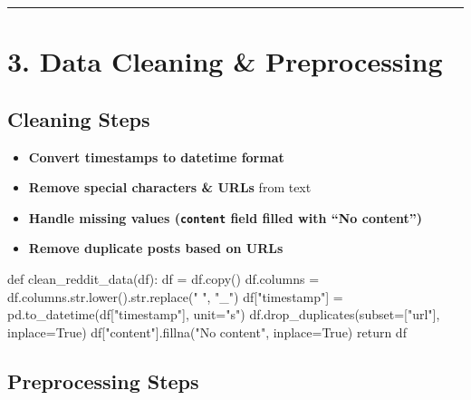 \documentclass[
  letterpaper,
  DIV=11,
  numbers=noendperiod]{scrartcl}
\newenvironment{Shaded}{\begin{snugshade}}{\end{snugshade}}
\newcommand{\BuiltInTok}[1]{\textcolor[rgb]{0.00,0.23,0.31}{#1}}
\newcommand{\ControlFlowTok}[1]{\textcolor[rgb]{0.00,0.23,0.31}{#1}}
\newcommand{\KeywordTok}[1]{\textcolor[rgb]{0.00,0.23,0.31}{#1}}
\newcommand{\NormalTok}[1]{\textcolor[rgb]{0.00,0.23,0.31}{#1}}
\newcommand{\OperatorTok}[1]{\textcolor[rgb]{0.37,0.37,0.37}{#1}}
\newcommand{\StringTok}[1]{\textcolor[rgb]{0.13,0.47,0.30}{#1}}
\newcommand{\VariableTok}[1]{\textcolor[rgb]{0.07,0.07,0.07}{#1}}
\providecommand{\tightlist}{%
  \setlength{\itemsep}{0pt}\setlength{\parskip}{0pt}}\usepackage{longtable,booktabs,array}
\begin{document}
\begin{center}\rule{0.5\linewidth}{0.5pt}\end{center}

\section{\texorpdfstring{\textbf{3. Data Cleaning \&
Preprocessing}}{3. Data Cleaning \& Preprocessing}}\label{data-cleaning-preprocessing}

\subsection{\texorpdfstring{\textbf{Cleaning
Steps}}{Cleaning Steps}}\label{cleaning-steps}

\begin{itemize}
\tightlist
\item
  \textbf{Convert timestamps to datetime format}
\item
  \textbf{Remove special characters \& URLs} from text
\item
  \textbf{Handle missing values (\texttt{content} field filled with ``No
  content'')}
\item
  \textbf{Remove duplicate posts based on URLs}
\end{itemize}

\begin{Shaded}
\begin{Highlighting}[]
\KeywordTok{def}\NormalTok{ clean\_reddit\_data(df):}
\NormalTok{    df }\OperatorTok{=}\NormalTok{ df.copy()}
\NormalTok{    df.columns }\OperatorTok{=}\NormalTok{ df.columns.}\BuiltInTok{str}\NormalTok{.lower().}\BuiltInTok{str}\NormalTok{.replace(}\StringTok{" "}\NormalTok{, }\StringTok{"\_"}\NormalTok{)}
\NormalTok{    df[}\StringTok{"timestamp"}\NormalTok{] }\OperatorTok{=}\NormalTok{ pd.to\_datetime(df[}\StringTok{"timestamp"}\NormalTok{], unit}\OperatorTok{=}\StringTok{"s"}\NormalTok{)}
\NormalTok{    df.drop\_duplicates(subset}\OperatorTok{=}\NormalTok{[}\StringTok{"url"}\NormalTok{], inplace}\OperatorTok{=}\VariableTok{True}\NormalTok{)}
\NormalTok{    df[}\StringTok{"content"}\NormalTok{].fillna(}\StringTok{"No content"}\NormalTok{, inplace}\OperatorTok{=}\VariableTok{True}\NormalTok{)}
    \ControlFlowTok{return}\NormalTok{ df}
\end{Highlighting}
\end{Shaded}

\subsection{\texorpdfstring{\textbf{Preprocessing
Steps}}{Preprocessing Steps}}\label{preprocessing-steps}
\end{document}
